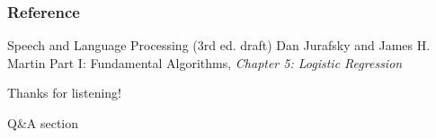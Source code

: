 \documentclass[13.5pt,aspecratio=169]{beamer}
\begin{document}
\onehalfspacing
\begin{frame} %
	\frametitle{Reference}
	
	\begin{thebibliography}{99} %
		\footnotesize %
		
			Speech and Language Processing (3rd ed. draft)
			\newblock Dan Jurafsky and James H. Martin
			\newblock Part I: Fundamental Algorithms, \emph{Chapter 5: 	Logistic Regression}
			
		
	\end{thebibliography}
\end{frame}




\begin{frame} %
	\begin{center}
		{\Huge Thanks for listening!}
		
		\bigskip\bigskip %
		
		{\LARGE Q\&A section}
	\end{center}
\end{frame}
\end{document}
